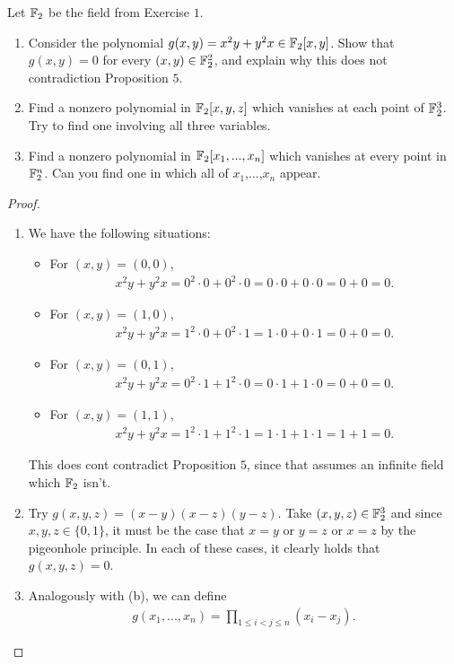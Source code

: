 \begin{exercise}{2}
Let $\mathbb{F}_2$ be the field from Exercise $1$.
\begin{enumerate}
    \item Consider the polynomial $g(x,y) = x^2 y + y^2 x\in \mathbb{F}_2[x,y]$. 
    Show that $g(x,y) = 0$ for every $(x,y)\in \mathbb{F}_2^2$, and explain why this does not contradiction Proposition $5$.
    \item Find a nonzero polynomial in $\mathbb{F}_2[x,y,z]$ which vanishes at each point of $\mathbb{F}_2^3$. 
    Try to find one involving all three variables.
    \item Find a nonzero polynomial in $\mathbb{F}_2[x_1,...,x_n]$ which vanishes at every point in $\mathbb{F}_2^n$. Can you find one in which all of $x_1$,...,$x_n$ appear.
\end{enumerate}
\end{exercise}
\begin{proof}
\begin{enumerate}
    \item We have the following situations:
    \begin{itemize}
        \item For $(x,y) = (0,0)$,
        \begin{align*}
            x^2 y + y^2 x = 0^2\cdot 0 + 0^2 \cdot 0 = 0\cdot 0 + 0\cdot 0 = 0 + 0 = 0.
        \end{align*}
        \item For $(x,y) = (1,0)$,
        \begin{align*}
            x^2 y + y^2 x = 1^2\cdot 0 + 0^2 \cdot 1 = 1\cdot 0 + 0\cdot 1 = 0 + 0 = 0.
        \end{align*}
        \item For $(x,y) = (0,1)$,
        \begin{align*}
            x^2 y + y^2 x = 0^2\cdot 1 + 1^2 \cdot 0 = 0\cdot 1 + 1\cdot 0 = 0 + 0 = 0.
        \end{align*}
        \item For $(x,y) = (1,1)$,
        \begin{align*}
            x^2 y + y^2 x = 1^2\cdot 1 + 1^2 \cdot 1 = 1\cdot 1 + 1\cdot 1 = 1 + 1 = 0.
        \end{align*}
    \end{itemize}
    This does cont contradict Proposition $5$, since that assumes an infinite field which $\mathbb{F}_2$ isn't.
    \item Try $g(x,y,z) = (x-y)(x-z)(y-z)$. 
    Take $(x,y,z)\in \mathbb{F}_2^3$ and since $x,y,z\in \{0,1\}$, it must be the case that $x=y$ or $y=z$ or $x=z$ by the pigeonhole principle. 
    In each of these cases, it clearly holds that $g(x,y,z) = 0$.
    \item Analogously with (b), we can define
    \begin{align*}
        g(x_1,...,x_n) = \prod_{1\leq i<j\leq n} (x_i - x_j).
    \end{align*}
\end{enumerate}    
\end{proof}

